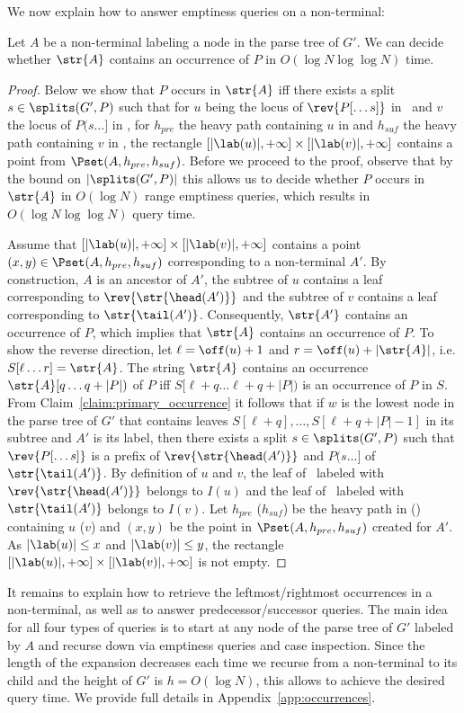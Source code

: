 We now explain how to answer emptiness queries on a non-terminal:
\begin{claim}\label{claim:emptiness}
Let $A$ be a non-terminal labeling a node in the parse tree of $G'$. We can decide whether $\str{A}$ contains an occurrence of $P$ in $O(\log N\log \log N)$ time. 
\end{claim} 
\begin{proof}
Below we show that $P$ occurs in $\str{A}$ iff there exists a split $s \in \splits(G',P)$ such that for $u$ being the locus of $\rev{P[\dots s]}$ in \Tpre\ and $v$ the locus of $P(s \dots]$ in \Tsuf , for $h_{pre}$ the heavy path containing $u$ in \Tpre and $h_{suf}$ the heavy path containing $v$ in \Tsuf , the rectangle $[|\lab(u)|,+\infty] \times [|\lab(v)|,+\infty]$ contains a point from $\Pset(A,h_{pre},h_{suf})$. Before we proceed to the proof, observe that by the bound on $|\splits(G',P)|$ this allows us to decide whether $P$ occurs in $\str{A}$ in $O(\log N)$ range emptiness queries, which results in $O(\log N\log \log N)$ query time. 

Assume that $[|\lab(u)|,+\infty] \times [|\lab(v)|,+\infty]$ contains a point $(x,y) \in \Pset(A,h_{pre},h_{suf})$ corresponding to a non-terminal $A'$. By construction, $A$ is an ancestor of $A'$, the subtree of $u$ contains a leaf corresponding to $\rev{\str{\head(A')}}$ and the subtree of $v$ contains a leaf corresponding to $\str{\tail(A')}$. Consequently, $\str{A'}$ contains an occurrence of $P$, which implies that $\str{A}$ contains an occurrence of $P$. 
%
To show the reverse direction, let $\ell = \off(u)+1$ and $r = \off(u)+|\str{A}|$, i.e. $S[\ell \dots r] = \str{A}$. The string $\str{A}$ contains an occurrence $\str{A}[q \ldots q+|P|)$ of $P$ iff $S[\ell+q \ldots \ell+q+|P|)$ is an occurrence of $P$ in $S$. From Claim~\ref{claim:primary_occurrence} it follows that if $w$ is the lowest node in the parse tree of $G'$ that contains leaves $S[\ell+q], \dots, S[\ell+q+|P|-1]$ in its subtree and $A'$ is its label, then there exists a split $s \in \splits(G',P)$ such that $\rev{P[\dots s]}$ is a prefix of $\rev{\str{\head(A')}}$ and $P(s\dots ]$ of $\str{\tail(A')}$. By definition of $u$ and $v$, the leaf of \Tpre\ labeled with $\rev{\str{\head(A')}}$ belongs to $I(u)$ and the leaf of \Tsuf\ labeled with $\str{\tail(A')}$ belongs to $I(v)$. Let $h_{pre}$ ($h_{suf}$) be the heavy path in \Tpre (\Tsuf) containing $u$ ($v$) and $(x,y)$ be the point in $\Pset(A,h_{pre},h_{suf})$ created for $A'$. As $|\lab(u)| \le x$ and $|\lab(v)| \le y$, the rectangle $[|\lab(u)|,+\infty] \times [|\lab(v)|,+\infty]$ is not empty.  
\end{proof}

It remains to explain how to retrieve the leftmost/rightmost occurrences in a non-terminal, as well as to answer predecessor/successor queries. The main idea for all four types of queries is to start at any node of the parse tree of $G'$ labeled by $A$ and recurse down via emptiness queries and case inspection. Since the length of the expansion decreases each time we recurse from a non-terminal to its child and the height of $G'$ is $h = O(\log N)$, this allows to achieve the desired query time. We provide full details in Appendix~\ref{app:occurrences}. %


